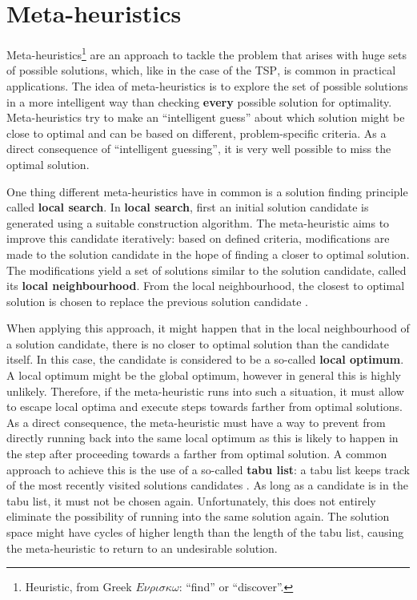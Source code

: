 \section{Meta-heuristics}
\label{chp:meta_heuristics}
Meta-heuristics\footnote{Heuristic, from Greek $E\nu\rho\iota\sigma\kappa\omega$: \enquote{find} or \enquote{discover}.} are an approach to tackle the problem that arises with huge sets of possible solutions, which, like in the case of the \textsc{TSP}, is common in practical applications. The idea of meta-heuristics is to explore the set of possible solutions in a more intelligent way than checking \textbf{every} possible solution for optimality. Meta-heuristics try to make an \enquote{intelligent guess} about which solution might be close to optimal and can be based on different, problem-specific criteria. As a direct consequence of \enquote{intelligent guessing}, it is very well possible to miss the optimal solution.

One thing different meta-heuristics have in common is a solution finding principle called \textbf{local search}. In \textbf{local search}, first an initial solution candidate is generated using a suitable construction algorithm. The meta-heuristic aims to improve this candidate iteratively: based on defined criteria, modifications are made to the solution candidate in the hope of finding a closer to optimal solution. The modifications yield a set of solutions similar to the solution candidate, called its \textbf{local neighbourhood}. From the local neighbourhood, the closest to optimal solution is chosen to replace the previous solution candidate \cite{Dorigo:2004:ACO:975277}.

When applying this approach, it might happen that in the local neighbourhood of a solution candidate, there is no closer to optimal solution than the candidate itself. In this case, the candidate is considered to be a so-called \textbf{local optimum}. A local optimum might be the global optimum, however in general this is highly unlikely. Therefore, if the meta-heuristic runs into such a situation, it must allow to escape local optima and execute steps towards farther from optimal solutions. As a direct consequence, the meta-heuristic must have a way to prevent from directly running back into the same local optimum as this is likely to happen in the step after proceeding towards a farther from optimal solution. A common approach to achieve this is the use of a so-called \textbf{tabu list}: a tabu list keeps track of the most recently visited solutions candidates \cite{Dorigo:2004:ACO:975277}. As long as a candidate is in the tabu list, it must not be chosen again. Unfortunately, this does not entirely eliminate the possibility of running into the same solution again. The solution space might have cycles of higher length than the length of the tabu list, causing the meta-heuristic to return to an undesirable solution.

